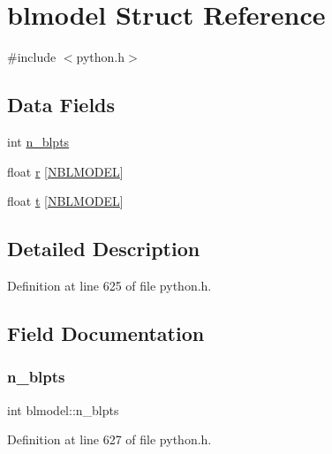 \hypertarget{structblmodel}{}\section{blmodel Struct Reference}
\label{structblmodel}


{\ttfamily \#include $<$python.\+h$>$}

\subsection*{Data Fields}
\begin{DoxyCompactItemize}
\item 
int \hyperlink{structblmodel_a67333da842bbda7495398e419940a5e3}{n\+\_\+blpts}
\item 
float \hyperlink{structblmodel_a3c3ff50710bb28bb464afe8b1e436b0b}{r} \mbox{[}\hyperlink{python_8h_ac7030ca4044704dd2a36d30676b75ffe}{N\+B\+L\+M\+O\+D\+EL}\mbox{]}
\item 
float \hyperlink{structblmodel_a58ed9c6aa9cdfa7a4d9b2346d5186ac2}{t} \mbox{[}\hyperlink{python_8h_ac7030ca4044704dd2a36d30676b75ffe}{N\+B\+L\+M\+O\+D\+EL}\mbox{]}
\end{DoxyCompactItemize}


\subsection{Detailed Description}


Definition at line 625 of file python.\+h.



\subsection{Field Documentation}
\mbox{\label{structblmodel_a67333da842bbda7495398e419940a5e3}} 
\subsubsection{\texorpdfstring{n\+\_\+blpts}{n\_blpts}}
{\footnotesize\ttfamily int blmodel\+::n\+\_\+blpts}



Definition at line 627 of file python.\+h.

\mbox{\label{structblmodel_a3c3ff50710bb28bb464afe8b1e436b0b}} 
